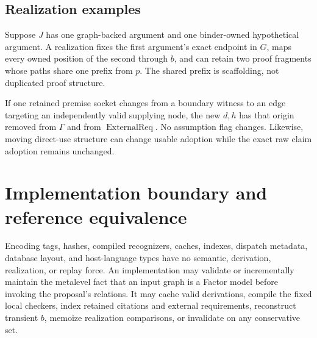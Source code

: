 \documentclass[11pt,twoside]{article}
\begin{document}
\subsection{Realization examples}

Suppose \(J\) has one graph-backed argument and one binder-owned hypothetical
argument.  A realization fixes the first argument's exact endpoint in \(G\), maps
every owned position of the second through \(b\), and can retain two proof
fragments whose paths share one prefix from \(p\).  The shared prefix is scaffolding,
not duplicated proof structure.

If one retained premise socket changes from a boundary witness to an edge targeting
an independently valid supplying node, the new \(d,h\) has that origin removed
from \(\Gamma\) and from \(\operatorname{ExternalReq}\).  No assumption flag
changes.  Likewise, moving direct-use structure can change usable adoption while
the exact raw claim adoption remains unchanged.

\section{Implementation boundary and reference equivalence}\label{sec:implementation}

Encoding tags, hashes, compiled recognizers, caches, indexes, dispatch metadata,
database layout, and host-language types have no semantic, derivation,
realization, or replay force.  An implementation may validate or incrementally
maintain the metalevel fact that an input graph is a Factor model before invoking
the proposal's relations.  It may cache valid derivations, compile the fixed local
checkers, index retained citations and external requirements, reconstruct transient
\(b\), memoize realization comparisons, or invalidate on any conservative set.
\end{document}

